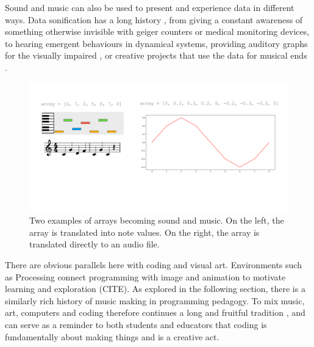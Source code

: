 Sound and music can also be used to present and experience data in different ways. Data sonification has a long history \cite{worrall_2019}, from giving a constant awareness of something otherwise invisible with geiger counters or medical monitoring devices, to hearing emergent behaviours in dynamical systems, providing auditory graphs for the visually impaired \cite{walker_mauney_2010}, or creative projects that use the data for musical ends \cite{bulley_jones_2011, barrett_mair_2014}.


\begin{figure}
    \centering
    \includegraphics[width=1\linewidth]{images/fig1_arrays_as_sound_and_music.pdf}
    \caption{Two examples of arrays becoming sound and music. On the left, the array is translated into note values. On the right, the array is translated directly to an audio file.}
    \label{fig:arrays-as-music}
\end{figure}

There are obvious parallels here with coding and visual art. Environments such as Processing \cite{reas2006processing} connect programming with image and animation to motivate learning and exploration (CITE). As explored in the following section, there is a similarly rich history of music making in programming pedagogy. To mix music, art, computers and coding therefore continues a long and fruitful tradition \cite{reichardt1971, Dreher2014, wang17}, and can serve as a reminder to both students and educators that coding is fundamentally about making things and is a creative act.





